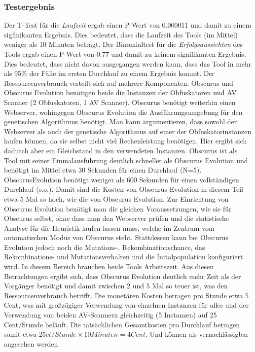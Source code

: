 \subsubsection{Testergebnis}
Der T-Test für die \textit{Laufzeit} ergab einen P-Wert von 0.000011 und damit zu einem sigfinikanten Ergebnis. Dies bedeutet, dass die Laufzeit des Tools (im Mittel) weniger als 10 Minuten beträgt.
Der Binomialtest für die \textit{Erfolgsaussichten} des Tools ergab einen P-Wert von 0.77 und damit zu keinem signifikanten Ergebnis. Dies bedeutet, dass nicht davon ausgegangen werden kann, dass das Tool in mehr als 95\% der Fälle im ersten Durchlauf zu einem Ergebnis kommt.
Der Ressourcenverbrauch verteilt sich auf mehrere Komponenten. Obscurus und Obscurus Evolution benötigen beide die Instanzen der Obfuskatoren und AV Scanner (2 Obfuskatoren, 1 AV Scanner). Obscurus benötigt weiterhin einen Webserver, wohingegen Obscurus Evolution die Ausführungsumgebung für den genetischen Algorithmus benötigt. Man kann argumentieren, dass sowohl der Webserver als auch der genetische Algorithmus auf einer der Obfuskatorinstanzen laufen können, da sie selbst nicht viel Rechenleistung benötigen. Hier ergibt sich dadurch aber ein Gleichstand in den verwendeten Instanzen.
Obscurus ist als Tool mit seiner Einmalausführung deutlich schneller als Obscurus Evolution und benötigt im Mittel etwa 30 Sekunden für einen Durchlauf (N=5). ObscurusEvolution benötigt weniger als 600 Sekunden für einen vollständigen Durchlauf (s.o.). Damit sind die Kosten von Obscurus Evolution in diesem Teil etwa 5 Mal so hoch, wie die von Obscurus Evolution.
Zur Einrichtung von Obscurus Evolution benötigt man die gleichen Voraussetzungen, wie sie für Obscurus selbst, ohne dass man den Webserver prüfen und die statistische Analyse für die Heuristik laufen lassen muss, welche im Zentrum vom automatischen Modus von Obscurus steht. Stattdessen kann bei Obscurus Evolution jedoch noch die Mutations-, Rekombinationschance, das Rekombinations- und Mutationsverhalten und die Initalpopulation konfiguriert wird. In diesem Bereich brauchen beide Tools Arbeitszeit.
Aus diesen Betrachtungen ergibt sich, dass Obscurus Evolution deutlich mehr Zeit als der Vorgänger benötigt und damit zwischen 2 und 5 Mal so teuer ist, was den Ressourcenverbrauch betrifft. Die monetären Kosten betragen pro Stunde etwa 5 Cent, was mit großzügiger Verwendung von einzelnen Instanzen für alles und der Verwendung von beiden AV-Scannern gleichzeitig (5 Instanzen) auf 25 Cent/Stunde beläuft. Die tatsächlichen Gesamtkosten pro Durchlauf betragen somit etwa $25ct/Stunde\times 10 Minuten = 4 Cent$. Und können als vernachlässigbar angesehen werden.


